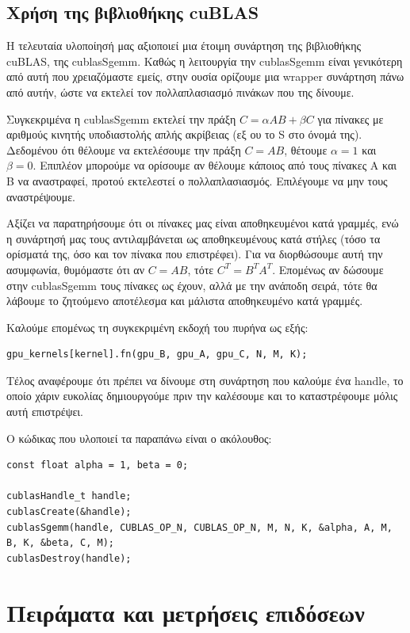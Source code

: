 \documentclass[titlepage]{article}
\begin{document}
\subsection{Χρήση της βιβλιοθήκης cuBLAS}

Η τελευταία υλοποίησή μας αξιοποιεί μια έτοιμη συνάρτηση της βιβλιοθήκης cuBLAS, της cublasSgemm. Καθώς η λειτουργία την cublasSgemm είναι γενικότερη από αυτή που χρειαζόμαστε εμείς, στην ουσία ορίζουμε μια wrapper συνάρτηση πάνω από αυτήν, ώστε να εκτελεί τον πολλαπλασιασμό πινάκων που της δίνουμε.

Συγκεκριμένα η cublasSgemm εκτελεί την πράξη $C=\alpha AB+\beta C$ για πίνακες με αριθμούς κινητής υποδιαστολής απλής ακρίβειας (εξ ου το S στο όνομά της). Δεδομένου ότι θέλουμε να εκτελέσουμε την πράξη $C=AB$, θέτουμε $\alpha=1$ και $\beta=0$. Επιπλέον μπορούμε να ορίσουμε αν θέλουμε κάποιος από τους πίνακες A και B να αναστραφεί, προτού εκτελεστεί ο πολλαπλασιασμός. Επιλέγουμε να μην τους αναστρέψουμε.

Αξίζει να παρατηρήσουμε ότι οι πίνακες μας είναι αποθηκευμένοι κατά γραμμές, ενώ η συνάρτησή μας τους αντιλαμβάνεται ως αποθηκευμένους κατά στήλες (τόσο τα ορίσματά της, όσο και τον πίνακα που επιστρέφει). Για να διορθώσουμε αυτή την ασυμφωνία, θυμόμαστε ότι αν $C=AB$, τότε $C^T=B^TA^T$. Επομένως αν δώσουμε στην cublasSgemm τους πίνακες ως έχουν, αλλά με την ανάποδη σειρά, τότε θα λάβουμε το ζητούμενο αποτέλεσμα και μάλιστα αποθηκευμένο κατά γραμμές.

Καλούμε επομένως τη συγκεκριμένη εκδοχή του πυρήνα ως εξής:

\begin{verbatim}
gpu_kernels[kernel].fn(gpu_B, gpu_A, gpu_C, N, M, K);
\end{verbatim}

Τέλος αναφέρουμε ότι πρέπει να δίνουμε στη συνάρτηση που καλούμε ένα handle, το οποίο χάριν ευκολίας δημιουργούμε πριν την καλέσουμε και το καταστρέφουμε μόλις αυτή επιστρέψει.

Ο κώδικας που υλοποιεί τα παραπάνω είναι ο ακόλουθος:

\begin{verbatim}
const float alpha = 1, beta = 0;

cublasHandle_t handle;
cublasCreate(&handle);
cublasSgemm(handle, CUBLAS_OP_N, CUBLAS_OP_N, M, N, K, &alpha, A, M, B, K, &beta, C, M);
cublasDestroy(handle);
\end{verbatim}

\newpage

\section{Πειράματα και μετρήσεις επιδόσεων}
\end{document}
